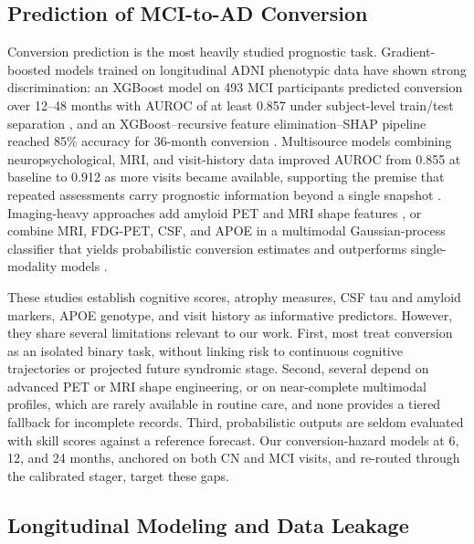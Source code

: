 \documentclass[11pt,a4paper]{article}
\begin{document}
\subsection{Prediction of MCI-to-AD Conversion}
\label{subsec:rw_conversion}

Conversion prediction is the most heavily studied prognostic task. Gradient-boosted models trained on longitudinal ADNI phenotypic data have shown strong discrimination: an XGBoost model on 493 MCI participants predicted conversion over 12--48 months with AUROC of at least 0.857 under subject-level train/test separation \cite{xgb2023longitudinal}, and an XGBoost--recursive feature elimination--SHAP pipeline reached 85\% accuracy for 36-month conversion \cite{grammenos2024xgboost}. Multisource models combining neuropsychological, MRI, and visit-history data improved AUROC from 0.855 at baseline to 0.912 as more visits became available, supporting the premise that repeated assessments carry prognostic information beyond a single snapshot \cite{platero2021multimodal}. Imaging-heavy approaches add amyloid PET and MRI shape features \cite{kim2023petmri}, or combine MRI, FDG-PET, CSF, and APOE in a multimodal Gaussian-process classifier that yields probabilistic conversion estimates and outperforms single-modality models \cite{zhang2012gp}.

These studies establish cognitive scores, atrophy measures, CSF tau and amyloid markers, APOE genotype, and visit history as informative predictors. However, they share several limitations relevant to our work. First, most treat conversion as an isolated binary task, without linking risk to continuous cognitive trajectories or projected future syndromic stage. Second, several depend on advanced PET or MRI shape engineering, or on near-complete multimodal profiles, which are rarely available in routine care, and none provides a tiered fallback for incomplete records. Third, probabilistic outputs are seldom evaluated with skill scores against a reference forecast. Our conversion-hazard models at 6, 12, and 24 months, anchored on both CN and MCI visits, and re-routed through the calibrated stager, target these gaps.

\subsection{Longitudinal Modeling and Data Leakage}
\label{subsec:rw_leakage}
\end{document}
